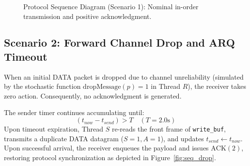\documentclass[11pt,a4paper]{article}
\begin{document}
\begin{figure}[htbp]
\caption{Protocol Sequence Diagram (Scenario 1): Nominal in-order transmission and positive acknowledgment.}
\label{fig:seq_normal}
\end{figure}

\subsection{Scenario 2: Forward Channel Drop and ARQ Timeout}
When an initial DATA packet is dropped due to channel unreliability (simulated by the stochastic function $\text{dropMessage}(p) = 1$ in Thread $R$), the receiver takes zero action. Consequently, no acknowledgment is generated.

The sender timer continues accumulating until:
\begin{equation}
    (t_{now} - t_{send}) > T \quad (T = 2.0\text{s})
\end{equation}
Upon timeout expiration, Thread $S$ re-reads the front frame of \texttt{write\_buf}, transmits a duplicate DATA datagram ($S=1, A=1$), and updates $t_{send} \leftarrow t_{now}$. Upon successful arrival, the receiver enqueues the payload and issues $\text{ACK}(2)$, restoring protocol synchronization as depicted in Figure~\ref{fig:seq_drop}.
\end{document}
